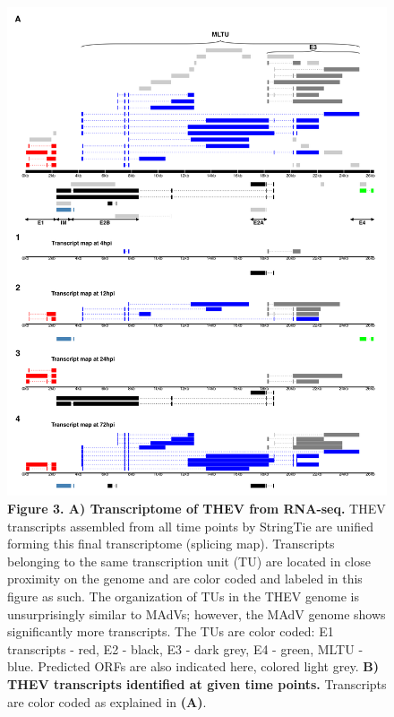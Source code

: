 \documentclass[
]{article}
\begin{document}
\begin{figure}
\centering
\includegraphics{results/r/figures/figure3.png}
\caption{\textbf{Figure 3. A) Transcriptome of THEV from RNA-seq.} THEV
transcripts assembled from all time points by StringTie are unified
forming this final transcriptome (splicing map). Transcripts belonging
to the same transcription unit (TU) are located in close proximity on
the genome and are color coded and labeled in this figure as such. The
organization of TUs in the THEV genome is unsurprisingly similar to
MAdVs; however, the MAdV genome shows significantly more transcripts.
The TUs are color coded: E1 transcripts - red, E2 - black, E3 - dark
grey, E4 - green, MLTU - blue. Predicted ORFs are also indicated here,
colored light grey. \textbf{B) THEV transcripts identified at given time
points.} Transcripts are color coded as explained in \textbf{(A)}.}
\end{figure}
\end{document}
